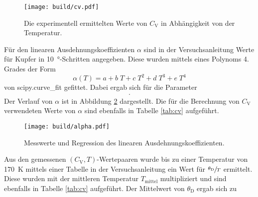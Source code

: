 \begin{figure}
  \centering
  \texttt{[image: build/cv.pdf]}      %
    \caption{Die experimentell ermittelten Werte von $C_\text{V}$ in Abhängigkeit
             von der Temperatur.}
  \label{fig:cv}
\end{figure}
\FloatBarrier

Für den linearen Ausdehnungskoeffizienten $\alpha$ sind in der Versuchsanleitung
\cite[p.~5]{anleitung}
Werte für Kupfer in \SI{10}{\degree}-Schritten angegeben. Diese wurden mittels eines Polynoms
4. Grades der Form
\begin{equation}
    \alpha(T) = a + b\;T + c\;T^2 + d\;T^3 + e\;T^4
\end{equation}
von scipy.curve\_fit gefittet. Dabei ergab sich für die Parameter
\begin{align}
    .
\end{align}
Der Verlauf von $\alpha$ ist in Abbildung \ref{fig:alpha} dargestellt.
Die für die Berechnung von $C_\text{V}$ verwendeten Werte von $\alpha$ sind ebenfalls
in Tabelle \ref{tab:cv} aufgeführt.

\begin{figure}
  \centering
  \texttt{[image: build/alpha.pdf]}      %
    \caption{Messwerte und Regression des linearen Ausdehnungskoeffizienten.}
  \label{fig:alpha}
\end{figure}

\FloatBarrier
Aus den gemessenen $(C_\text{V}, T)$-Wertepaaren wurde bis zu einer Temperatur von
\SI{170}{\kelvin} mittels einer Tabelle in der
Versuchsanleitung ein Wert für $\sfrac{\theta_\text{D}}{T}$ ermittelt. Diese wurden
mit der mittleren Temperatur $T_\text{mittel}$ multipliziert und sind ebenfalls
in Tabelle \ref{tab:cv} aufgeführt. Der Mittelwert von $\theta_\text{D}$ ergab sich
zu %




